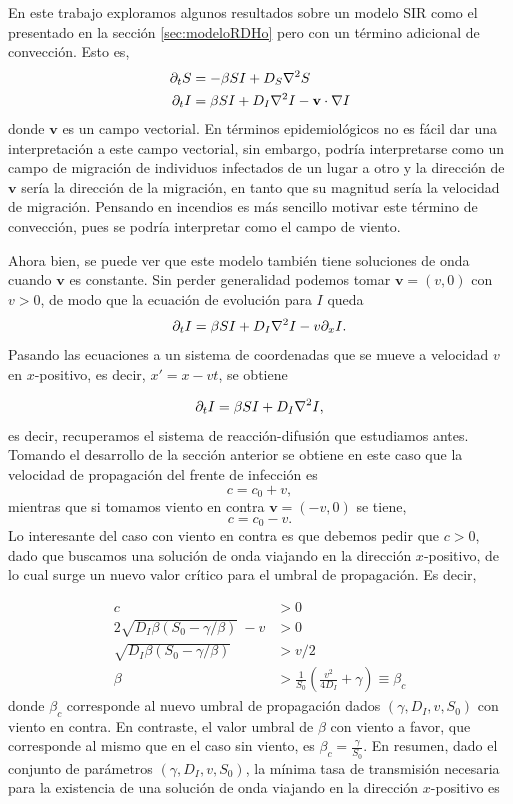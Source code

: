 
En este trabajo exploramos algunos resultados sobre un modelo SIR como el presentado en la sección \ref{sec:modeloRDHo} pero con un término adicional de convección. Esto es,
\begin{align}
  \partial_t S & = -\beta SI + D_S \laplacian{S} \label{S_eq_v}\\
  \partial_t I &= \beta SI + D_I \laplacian{I}- \mathbf{v} \cdot \nabla I \label{I_eq_v}
\end{align}
donde $\mathbf{v}$ es un campo vectorial. En términos epidemiológicos no es fácil dar una interpretación a este campo vectorial, sin embargo, podría interpretarse 
como un campo de migración de individuos infectados de un lugar a otro y la dirección de $\mathbf{v}$ sería la dirección de la migración, en tanto que su magnitud 
sería la velocidad de migración. Pensando en incendios es más sencillo motivar este término de convección, pues se podría interpretar como el campo de viento. 

Ahora bien, se puede ver que este modelo también tiene soluciones de onda cuando $\mathbf{v}$ es constante. Sin perder generalidad podemos tomar $\mathbf{v}=(v,0)$ con 
$v>0$, de modo que la ecuación de evolución para $I$ queda
\begin{equation}
  \partial_t I = \beta SI + D_I \laplacian{I}- v \partial_x I.
\end{equation}
Pasando las ecuaciones a un sistema de coordenadas que se mueve a velocidad $v$ en $x$-positivo, es decir, $x'=x-vt$, se obtiene 

\begin{equation}
  \partial_t I = \beta SI + D_I \laplacian{I},
\end{equation}
es decir, recuperamos el sistema de reacción-difusión que estudiamos antes. Tomando el desarrollo de la sección anterior se obtiene en este caso que la velocidad de propagación 
del frente de infección es 
$$c = c_0 + v,$$
mientras que si tomamos viento en contra $\mathbf{v} = (-v,0)$ se tiene,
$$c = c_0 - v.$$
Lo interesante del caso con viento en contra es que debemos pedir que $c>0$, dado que buscamos una solución de onda viajando en la dirección $x$-positivo, de lo cual surge un nuevo valor crítico para el umbral de propagación. Es decir,

\begin{align}
  c &> 0 \nonumber \\
  2\sqrt{D_I\beta(S_0-\gamma/\beta)}\ - v &> 0 \nonumber \\
  \sqrt{D_I\beta(S_0-\gamma/\beta)} &> v/2 \nonumber \\
  \beta &> \frac{1}{S_0}(\frac{v^2}{4D_I}+\gamma) \equiv \beta_c 
\end{align}
donde $\beta_c$ corresponde al nuevo umbral de propagación dados $(\gamma,D_I,v,S_0)$ con viento en contra. En contraste, el valor umbral de $\beta$ con viento a favor, que 
corresponde al mismo que en el caso sin viento, es $\beta_c = \frac{\gamma}{S_0}$. En resumen, dado el conjunto de parámetros $(\gamma,D_I,v,S_0)$, la mínima tasa de transmisión
necesaria para la existencia de una solución de onda viajando en la dirección $x$-positivo es

